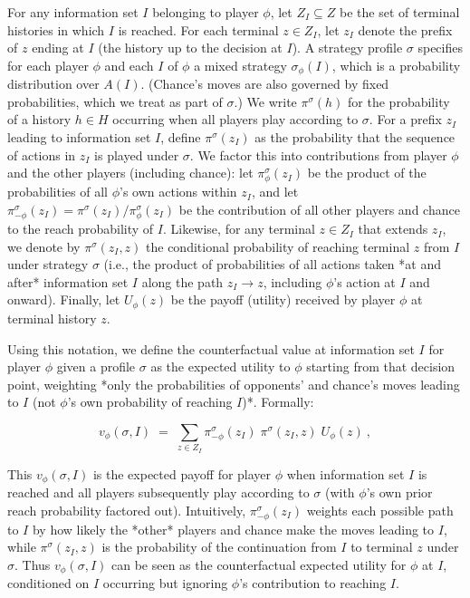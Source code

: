 \documentclass{article}
\begin{document}
For any information set $I$ belonging to player $\phi$, let $Z_I \subseteq Z$ be the set of terminal histories in which $I$ is reached.  For each terminal $z \in Z_I$, let $z_I$ denote the prefix of $z$ ending at $I$ (the history up to the decision at $I$). A strategy profile $\sigma$ specifies for each player $\phi$ and each $I$ of $\phi$ a mixed strategy $\sigma_\phi(I)$, which is a probability distribution over $A(I)$.  (Chance’s moves are also governed by fixed probabilities, which we treat as part of $\sigma$.) We write $\pi^\sigma(h)$ for the probability of a history $h \in H$ occurring when all players play according to $\sigma$.  For a prefix $z_I$ leading to information set $I$, define $\pi^\sigma(z_I)$ as the probability that the sequence of actions in $z_I$ is played under $\sigma$. We factor this into contributions from player $\phi$ and the other players (including chance): let $\pi^\sigma_{\phi}(z_I)$ be the product of the probabilities of all $\phi$’s own actions within $z_I$, and let $\pi^\sigma_{-\phi}(z_I) = \pi^\sigma(z_I) / \pi^\sigma_{\phi}(z_I)$ be the contribution of all other players and chance to the reach probability of $I$. Likewise, for any terminal $z \in Z_I$ that extends $z_I$, we denote by $\pi^\sigma(z_I, z)$ the conditional probability of reaching terminal $z$ from $I$ under strategy $\sigma$ (i.e., the product of probabilities of all actions taken *at and after* information set $I$ along the path $z_I \to z$, including $\phi$’s action at $I$ and onward). Finally, let $U_\phi(z)$ be the payoff (utility) received by player $\phi$ at terminal history $z$.

Using this notation, we define the counterfactual value at information set $I$ for player $\phi$ given a profile $\sigma$ as the expected utility to $\phi$ starting from that decision point, weighting *only the probabilities of opponents’ and chance’s moves leading to $I$ (not $\phi$’s own probability of reaching $I$)*. Formally: 

\begin{equation}\label{eq:counterfactual-value}
v_{\phi}(\sigma, I) \;=\; \sum_{z \in Z_I} \pi^\sigma_{-\phi}(z_I)\;\pi^\sigma(z_I, z)\;U_{\phi}(z)~,
\end{equation}

This $v_{\phi}(\sigma,I)$ is the expected payoff for player $\phi$ when information set $I$ is reached and all players subsequently play according to $\sigma$ (with $\phi$’s own prior reach probability factored out). Intuitively, $\pi^\sigma_{-\phi}(z_I)$ weights each possible path to $I$ by how likely the *other* players and chance make the moves leading to $I$, while $\pi^\sigma(z_I,z)$ is the probability of the continuation from $I$ to terminal $z$ under $\sigma$. Thus $v_{\phi}(\sigma,I)$ can be seen as the counterfactual expected utility for $\phi$ at $I$, conditioned on $I$ occurring but ignoring $\phi$’s contribution to reaching $I$.
\end{document}
